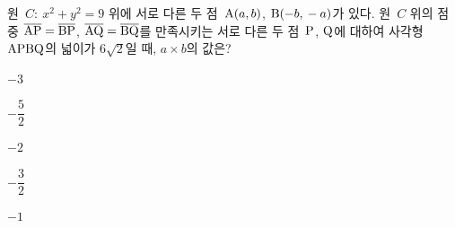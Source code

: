 원~$C:\ x^2+y^2=9$ 위에 서로 다른 두 점~$\mathrm{A}(a{,}\mkern3mu b)$, $\mathrm{B}(-b{,}\mkern3mu -a)$가 있다. 원~$C$ 위의 점 중 $\overline{\mathrm{AP}}=\overline{\mathrm{BP}}$, $\overline{\mathrm{AQ}}=\overline{\mathrm{BQ}}$를 만족시키는 서로 다른 두 점~$\mathrm{P}$, $\mathrm{Q}$에 대하여 사각형~$\mathrm{APBQ}$의 넓이가 $6\sqrt2$일 때, $a\times b$의 값은?
\begin{choices32}{\rule[-3ex]{0pt}{8ex}$-3$}{\rule[-3ex]{0pt}{8ex}$-\dfrac52$}{\rule[-3ex]{0pt}{8ex}$-2$}{\rule[-3ex]{0pt}{8ex}$-\dfrac32$}{\rule[-3ex]{0pt}{8ex}$-1$}\end{choices32}
